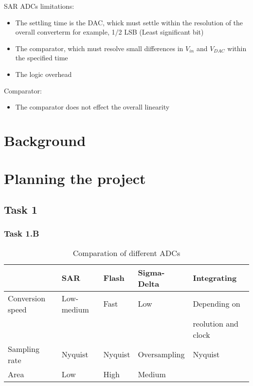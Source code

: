 \documentclass[english, 12pt, a4paper]{article}
\begin{document}
SAR ADCs limitations:

\begin{itemize}
 \item The settling time is the DAC, whick must settle within the resolution of the overall converterm for example, 1/2 LSB (Least significant bit)
 \item The comparator, which must resolve small differences in $V_{in}$ and $V_{DAC}$ within the specified time
 \item The logic overhead

 \end{itemize}
Comparator:

\begin{itemize}
 \item The comparator does not effect the overall linearity 
\end{itemize}

\chapter{Background}


\chapter{Planning the project} 
\section{Task 1}
\subsection{Task 1.B}
\begin{table}
 \centering
 \caption{Comparation of different ADCs}
 \label{comp:adc}
 \begin{tabular}{|l|l|l|l|l|}
 \hline
                  & SAR        & Flash   & Sigma-Delta  & Integrating                      \\ \hline
 Conversion speed & Low-medium & Fast    & Low          & Depending on \\
		  &	       &	 &		&reolution and clock 		   \\ \hline
 Sampling rate    & Nyquist    & Nyquist & Oversampling & Nyquist                          \\ \hline
 Area             & Low        & High    & Medium       &                                  \\ \hline
 \end{tabular}
 \end{table}
\end{document}
